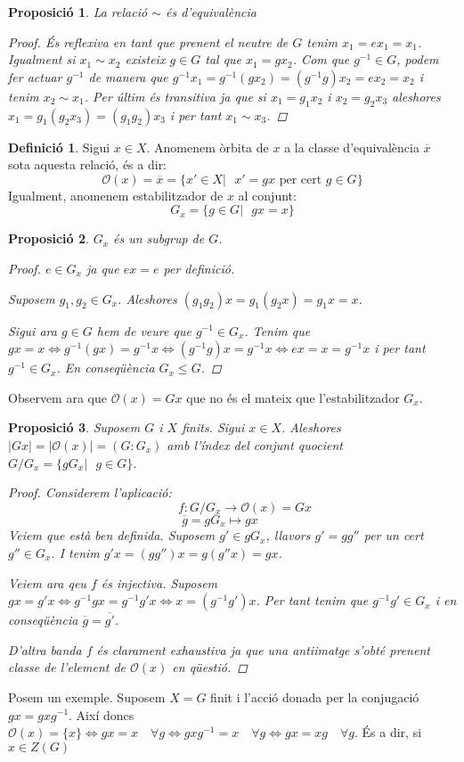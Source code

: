 \documentclass[a4paper,11pt]{report}
\newcommand{\inv}[1]{#1^{-1}}
\newcommand{\orb}{\mathcal{O}}
\renewcommand{\bar}{\overline}
\theoremstyle{theorem}
\newtheorem{proposicio}{\normalfont \sffamily\bfseries Proposició}[section]
\theoremstyle{definition}
\newtheorem{definicio}{\normalfont\sffamily\bfseries Definició}[section]
\begin{document}
\begin{proposicio} La relació $\sim$ és d'equivalència
	\begin{proof}
		És reflexiva en tant que prenent el neutre de $G$ tenim $x_1=ex_1=x_1$. Igualment si $x_1\sim x_2$ existeix $g\in G$ tal que $x_1=gx_2$. Com que $\inv{g}\in G$, podem fer actuar $\inv{g}$ de manera que $\inv{g}x_1=\inv{g}(gx_2)=(\inv{g}g)x_2=ex_2=x_2$ i tenim $x_2\sim x_1$. Per últim és transitiva ja que si $x_1=g_1 x_2$ i $x_2=g_2 x_3$ aleshores $x_1=g_1 (g_2 x_3)=(g_1 g_2)x_3$ i per tant $x_1\sim x_3$. 
	\end{proof}
\end{proposicio}
\begin{definicio}
	Sigui $x\in X$. Anomenem òrbita de $x$ a la classe d'equivalència $\bar{x}$ sota aquesta relació, és a dir:
	$$\orb(x)=\bar{x}=\{x'\in X|\text{ }x'=gx\text{ per cert }g\in G\}$$
	Igualment, anomenem estabilitzador de $x$ al conjunt:
	$$G_x=\{g\in G|\text{ }gx=x\}$$
\end{definicio}
\begin{proposicio}
	$G_x$ és un subgrup de $G$.\begin{proof}
		$e\in G_x$ ja que $ex=e$ per definició.
		
		Suposem $g_1,g_2\in G_x$. Aleshores $(g_1g_2)x=g_1(g_2 x)=g_1 x=x$.
		
		Sigui ara $g\in G$ hem de veure que $\inv{g}\in G_x$. Tenim que $gx=x\Leftrightarrow \inv{g}(gx)=\inv{g}x\Leftrightarrow (\inv{g}g)x=\inv{g}x\Leftrightarrow ex=x=\inv{g}x$ i per tant $\inv{g}\in G_x$. En conseqüència $G_x\leq G$.
	\end{proof}
\end{proposicio}

Observem ara que $\orb(x)=Gx$ que no és el mateix que l'estabilitzador $G_x$.
\begin{proposicio}
	Suposem $G$ i $X$ finits. Sigui $x\in X$. Aleshores $|Gx|=|\orb(x)|=(G:G_x)$ amb l'índex del conjunt quocient $G/G_x=\{gG_x|\text{ }g\in G\}$.
	\begin{proof}
		Considerem l'aplicació:$$\qquad f:G/G_x\longrightarrow \orb(x)=Gx$$
		$$\bar{g}=gG_x\longmapsto gx\qquad$$
Veiem que està ben definida. Suposem $g'\in gG_x$, llavors $g'=gg''$ per un cert $g''\in G_x$. I tenim $g'x=(gg'')x=g(g''x)=gx$.

Veiem ara qeu $f$ és injectiva. Suposem $gx=g'x\Leftrightarrow \inv{g}gx=\inv{g}g'x\Leftrightarrow x=(\inv{g}g')x$. Per tant tenim que $\inv{g}g'\in G_x$ i en conseqüència $\bar{g}=\bar{g'}$.

D'altra banda $f$ és clarament exhaustiva ja que una antiimatge s'obté prenent classe de l'element de $\orb(x)$ en qüestió.
\end{proof}
\end{proposicio}
Posem un exemple. Suposem $X=G$ finit i l'acció donada per la conjugació $gx=gx\inv{g}$. Així doncs $\orb(x)=\{x\}\Leftrightarrow gx=x \quad\forall g\Leftrightarrow gx\inv{g}=x \quad\forall g\Leftrightarrow gx=xg \quad\forall g$. És a dir, si $x\in Z(G)$ 
\end{document}
